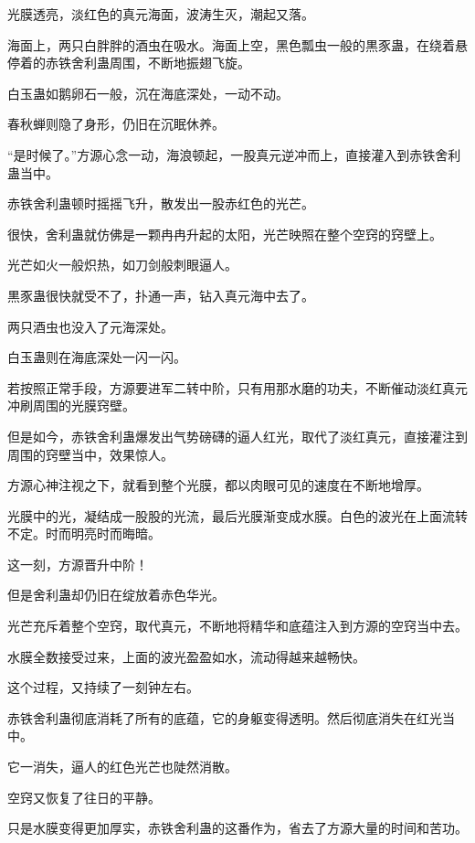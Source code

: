 
\begin{this_body}

光膜透亮，淡红色的真元海面，波涛生灭，潮起又落。

海面上，两只白胖胖的酒虫在吸水。海面上空，黑色瓢虫一般的黒豕蛊，在绕着悬停着的赤铁舍利蛊周围，不断地振翅飞旋。

白玉蛊如鹅卵石一般，沉在海底深处，一动不动。

春秋蝉则隐了身形，仍旧在沉眠休养。

“是时候了。”方源心念一动，海浪顿起，一股真元逆冲而上，直接灌入到赤铁舍利蛊当中。

赤铁舍利蛊顿时摇摇飞升，散发出一股赤红色的光芒。

很快，舍利蛊就仿佛是一颗冉冉升起的太阳，光芒映照在整个空窍的窍壁上。

光芒如火一般炽热，如刀剑般刺眼逼人。

黒豕蛊很快就受不了，扑通一声，钻入真元海中去了。

两只酒虫也没入了元海深处。

白玉蛊则在海底深处一闪一闪。

若按照正常手段，方源要进军二转中阶，只有用那水磨的功夫，不断催动淡红真元冲刷周围的光膜窍壁。

但是如今，赤铁舍利蛊爆发出气势磅礴的逼人红光，取代了淡红真元，直接灌注到周围的窍壁当中，效果惊人。

方源心神注视之下，就看到整个光膜，都以肉眼可见的速度在不断地增厚。

光膜中的光，凝结成一股股的光流，最后光膜渐变成水膜。白色的波光在上面流转不定。时而明亮时而晦暗。

这一刻，方源晋升中阶！

但是舍利蛊却仍旧在绽放着赤色华光。

光芒充斥着整个空窍，取代真元，不断地将精华和底蕴注入到方源的空窍当中去。

水膜全数接受过来，上面的波光盈盈如水，流动得越来越畅快。

这个过程，又持续了一刻钟左右。

赤铁舍利蛊彻底消耗了所有的底蕴，它的身躯变得透明。然后彻底消失在红光当中。

它一消失，逼人的红色光芒也陡然消散。

空窍又恢复了往日的平静。

只是水膜变得更加厚实，赤铁舍利蛊的这番作为，省去了方源大量的时间和苦功。


\end{this_body}
